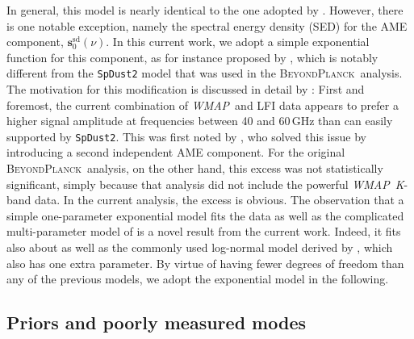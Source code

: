 \documentclass[twocolumn]{../../common/aa}
\def\WMAP{\emph{WMAP}}
\newcommand{\bp}{\textsc{BeyondPlanck}}
\newcommand{\K}[0]{\textit K}
\begin{document}
In general, this model is nearly identical to the one adopted by \citet{bp01}. However, there is one notable exception, namely the spectral energy density (SED) for the AME component, $\boldsymbol s_0^\mathrm{sd}(\nu)$. In this current work, we adopt a simple exponential function for this component, as for instance proposed by \citet{hensley:2015}, which is notably different from the \texttt{SpDust2} model \citep{ali-haimoud:2009, ali-haimoud:2010, silsbee:2011} that was used in the \bp\ analysis. The motivation for this modification is discussed in detail by \citet{watts2023_ame}: First and foremost, the current combination of \WMAP\ and LFI data appears to prefer a higher signal amplitude at frequencies between 40 and 60\,GHz than can easily supported by \texttt{SpDust2}. This was first noted by \citet{planck2014-a11}, who solved this issue by introducing a second independent AME component. For the original \bp\ analysis, on the other hand, this excess was not statistically significant, simply because that analysis did not include the powerful \WMAP\ \K-band data. In the current analysis, the excess is obvious. The observation that a simple one-parameter exponential model fits the data as well as the complicated multi-parameter model of \citet{planck2014-a11} is a novel result from the current work. Indeed, it fits also about as well as the commonly used log-normal model derived by \citet{Stevenson_2014}, which also has one extra parameter. By virtue of having fewer degrees of freedom than any of the previous models, we adopt the exponential model in the following.


\subsection{Priors and poorly measured modes}
\label{sec:priors}
\end{document}
